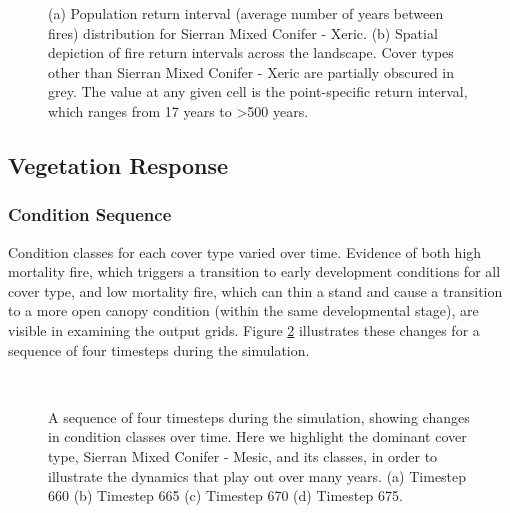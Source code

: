 \begin{figure}[!htbp]
  \centering
  \caption{(a) Population return interval (average number of years between fires) distribution for Sierran Mixed Conifer - Xeric.  (b) Spatial depiction of fire return intervals across the landscape. Cover types other than Sierran Mixed Conifer - Xeric are partially obscured in grey. The value at any given cell is the point-specific return interval, which ranges from 17 years to \textgreater 500 years.}
\label{fig:preturn_smcx}
\end{figure}

\clearpage

\subsection{Vegetation Response}
\label{subsec:HRVvegresponse}

\subsubsection{Condition Sequence}

Condition classes for each cover type varied over time. Evidence of both high mortality fire, which triggers a transition to early development conditions for all cover type, and low mortality fire, which can thin a stand and cause a transition to a more open canopy condition (within the same developmental stage), are visible in examining the output grids. Figure \ref{fig:covcondmaps} illustrates these changes for a sequence of four timesteps during the simulation.

\begin{figure}[!htbp]
  \centering
  \\%
  \caption{A sequence of four timesteps during the simulation, showing changes in condition classes over time. Here we highlight the dominant cover type, Sierran Mixed Conifer - Mesic, and its classes, in order to illustrate the dynamics that play out over many years. (a) Timestep 660 (b) Timestep 665 (c) Timestep 670 (d) Timestep 675.}
  \label{fig:covcondmaps}
\end{figure}

